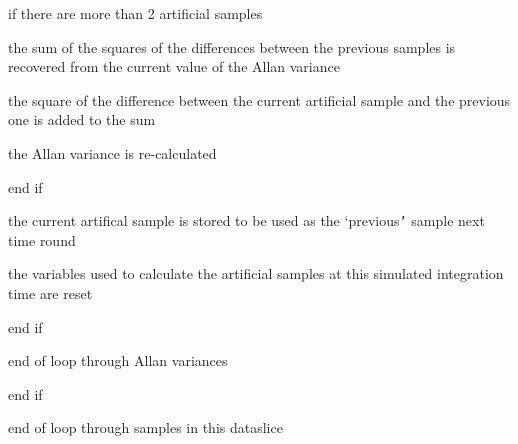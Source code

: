 {{                  if there are more than 2 artificial samples

                     the sum of the squares of the differences between the
                     previous samples is recovered from the current value of the
                     Allan variance

                     the square of the difference between the current artificial
                     sample and the previous one is added to the sum

                     the Allan variance is re-calculated

                  end if

                  the current artifical sample is stored to be used as the
                  `previous{\tt '} sample next time round

                  the variables used to calculate the artificial samples at
                  this simulated integration time are reset

               end if

            end of loop through Allan variances

         end if

      end of loop through samples in this dataslice
   }
}
